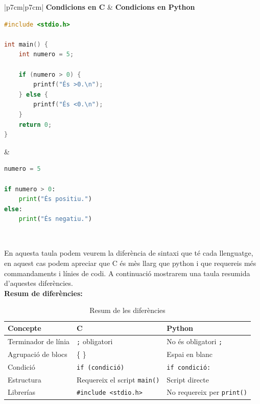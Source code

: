 \begin{table}[h!]
\centering
\begin{tabular}{|p{7cm}|p{7cm}|}
\hline
\textbf{Condicions en C} & \textbf{Condicions en Python} \\ \hline

\begin{minipage}[t]{\linewidth}
\begin{lstlisting}[language=C]
#include <stdio.h>

int main() {
    int numero = 5;

    if (numero > 0) {
        printf("És >0.\n");
    } else {
        printf("És <0.\n");
    }
    return 0;
}
\end{lstlisting}
\end{minipage}
&
\begin{minipage}[t]{\linewidth}
\begin{lstlisting}[language=Python]
numero = 5

if numero > 0:
    print("És positiu.")
else:
    print("És negatiu.")
\end{lstlisting}
\end{minipage}
\\ \hline
\end{tabular}
\caption{Comparació de condicions en C i Python}
\end{table}




En aquesta taula podem veurem la diferència de sintaxi que té cada llenguatge, en aquest cas podem apreciar que C és mès llarg que python i que requereis més commandaments i línies de codi. A continuació mostrarem una taula resumida d'aquestes diferències.
\\

\textbf{Resum de diferències:}
\begin{table}[h!]
\centering
\begin{tabular}{|l|l|l|}
\hline
\textbf{Concepte} & \textbf{C} & \textbf{Python} \\
\hline
Terminador de línia & \verb|;| obligatori & No és obligatori \verb|;| \\
\hline
Agrupació de blocs & \{ \} & Espai en blanc \\
\hline
Condició & \verb|if (condició)| & \verb|if condició:| \\
\hline
Estructura & Requereix el script \verb|main()| & Script directe \\
\hline
Librerías & \verb|#include <stdio.h>| & No requereix per \verb|print()| \\
\hline
\end{tabular}
\caption{Resum de les diferències}
\end{table}

